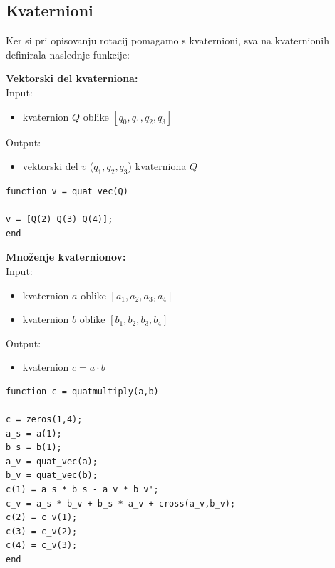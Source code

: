 \documentclass[12pt,a4paper,twoside]{article}
\theoremstyle{definition} %
\theoremstyle{plain} %
\numberwithin{equation}{section}  %
\begin{document}
\newpage
\subsection{Kvaternioni}
Ker si pri opisovanju rotacij pomagamo s kvaternioni, sva na kvaternionih definirala naslednje funkcije:

%

\vspace{1cm}
\textbf{Vektorski del kvaterniona:}\\
Input:
\begin{itemize}
\item kvaternion $Q$ oblike $[q_0,q_1,q_2,q_3]$
\end{itemize}
Output:
\begin{itemize}
\item vektorski del $v$ ($q_1,q_2,q_3$) kvaterniona $Q$
\end{itemize}

\begin{lstlisting}[caption = {quat\_vec}]
function v = quat_vec(Q)

v = [Q(2) Q(3) Q(4)];
end
\end{lstlisting}


\vspace{1cm}
\textbf{Množenje kvaternionov:}\\
Input:
\begin{itemize}
\item kvaternion $a$ oblike $[a_1,a_2,a_3,a_4]$
\item kvaternion $b$ oblike $[b_1,b_2,b_3,b_4]$
\end{itemize}
Output:
\begin{itemize}
\item kvaternion $c = a \cdot b$
\end{itemize}

\begin{lstlisting}[caption = {quatmultiply}]
function c = quatmultiply(a,b)

c = zeros(1,4);
a_s = a(1);
b_s = b(1);
a_v = quat_vec(a);
b_v = quat_vec(b);
c(1) = a_s * b_s - a_v * b_v';
c_v = a_s * b_v + b_s * a_v + cross(a_v,b_v);
c(2) = c_v(1);
c(3) = c_v(2);
c(4) = c_v(3);
end
\end{lstlisting}
\end{document}
